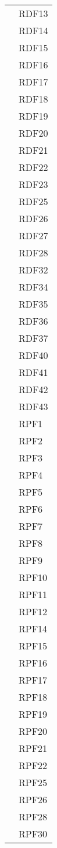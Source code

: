 \begin{longtable}{| p{5cm} | p{5cm} |}
				&	RDF13 \\
				&	RDF14 \\
				&	RDF15 \\
				&	RDF16 \\
				&	RDF17 \\
				&	RDF18 \\
				&	RDF19 \\
				&	RDF20 \\
				&	RDF21 \\
				&	RDF22 \\
				&	RDF23 \\
				&	RDF25 \\
				&	RDF26 \\
				&	RDF27 \\
				&	RDF28 \\
				&	RDF32 \\
				& RDF34\\%
				& RDF35 \\%
				&	RDF36 \\
				&	RDF37 \\

				&	RDF40 \\
				&	RDF41 \\
				&	RDF42 \\
				& RDF43 \\%
				&	RPF1 \\
				&	RPF2 \\
				&	RPF3 \\
				&	RPF4 \\
				&	RPF5 \\
				&	RPF6 \\
				&	RPF7 \\
				&	RPF8 \\
				&	RPF9 \\
				&	RPF10 \\
				&	RPF11 \\
				&	RPF12 \\
				&	RPF14 \\
				&	RPF15 \\
				&	RPF16 \\
				&	RPF17 \\
				&	RPF18 \\
				&	RPF19 \\
				&	RPF20 \\
				&	RPF21 \\
				&	RPF22 \\
				&	RPF25 \\
				& 	RPF26 \\
				& 	RPF28 \\
				& 	RPF30 \\
				

\end{longtable}

